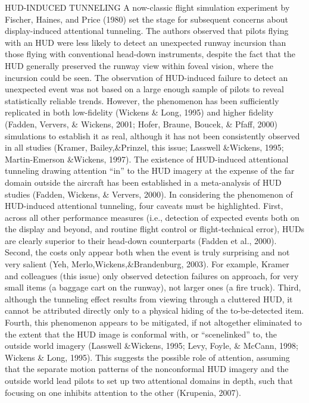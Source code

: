 \documentclass[utf8,bachelor,manualbib]{gradu3}
\begin{document}
HUD-INDUCED TUNNELING
A now-classic flight simulation experiment by Fischer, Haines, and Price (1980)
set the stage for subsequent concerns about display-induced attentional tunneling. The authors observed that pilots flying with an HUD were less likely to detect an
unexpected runway incursion than those flying with conventional head-down instruments,
despite the fact that the HUD generally preserved the runway view
within foveal vision, where the incursion could be seen. The observation of
HUD-induced failure to detect an unexpected event was not based on a large
enough sample of pilots to reveal statistically reliable trends. However, the phenomenon
has been sufficiently replicated in both low-fidelity (Wickens \& Long,
1995) and higher fidelity (Fadden, Ververs, \& Wickens, 2001; Hofer, Braune,
Boucek, \& Pfaff, 2000) simulations to establish it as real, although it has not been
consistently observed in all studies (Kramer, Bailey,\&Prinzel, this issue; Lasswell
\&Wickens, 1995; Martin-Emerson \&Wickens, 1997). The existence of HUD-induced
attentional tunneling drawing attention “in” to the HUD imagery at the expense
of the far domain outside the aircraft has been established in a meta-analysis
of HUD studies (Fadden, Wickens, \& Ververs, 2000).
In considering the phenomenon of HUD-induced attentional tunneling, four caveats
must be highlighted. First, across all other performance measures (i.e., detection
of expected events both on the display and beyond, and routine flight control
or flight-technical error), HUDs are clearly superior to their head-down counterparts
(Fadden et al., 2000). Second, the costs only appear both when the event is
truly surprising and not very salient (Yeh, Merlo,Wickens,\&Brandenburg, 2003).
For example, Kramer and colleagues (this issue) only observed detection failures
on approach, for very small items (a baggage cart on the runway), not larger ones (a
fire truck). Third, although the tunneling effect results from viewing through a
cluttered HUD, it cannot be attributed directly only to a physical hiding of the
to-be-detected item. Fourth, this phenomenon appears to be mitigated, if not altogether
eliminated to the extent that the HUD image is conformal with, or “scenelinked”
to, the outside world imagery (Lasswell \&Wickens, 1995; Levy, Foyle, \&
McCann, 1998; Wickens \& Long, 1995). This suggests the possible role of attention,
assuming that the separate motion patterns of the nonconformal HUD imagery
and the outside world lead pilots to set up two attentional domains in depth,
such that focusing on one inhibits attention to the other (Krupenia, 2007).
\end{document}
